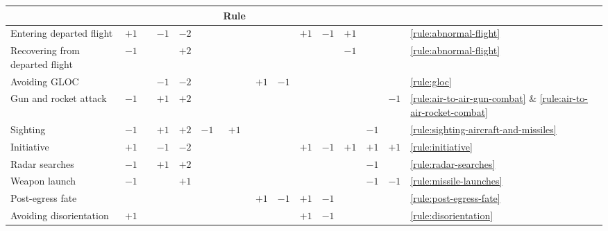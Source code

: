 \begin{twocolumntablefloat}
\begin{twocolumntable}
{\begin{tabularx}{1.0\linewidth}{l*{13}{C}l}
&&
&&&
&Rule\\
\midrule
Entering departed flight        &$+1$&    &$-1$&$-2$&     &     &    &     &$+1$&$-1$&$+1$ &    &    
&\ref{rule:abnormal-flight}\\
Recovering from departed flight &$-1$&    &    &$+2$&     &     &    &     &    &    &$-1$ &    &    
&\ref{rule:abnormal-flight}\\
Avoiding GLOC                   &    &    &$-1$&$-2$&     &     &$+1$&$-1$ &    &    &     &    &    
&\ref{rule:gloc}\\
Gun and rocket attack           &$-1$&    &$+1$&$+2$&     &     &    &     &    &    &     &    &$-1$
&\ref{rule:air-to-air-gun-combat} \& \ref{rule:air-to-air-rocket-combat}\\
Sighting                        &$-1$&    &$+1$&$+2$& $-1$&$+1$ &    &     &    &    &     &$-1$&    
&\ref{rule:sighting-aircraft-and-missiles}\\
Initiative                      &$+1$&    &$-1$&$-2$&     &     &    &     &$+1$&$-1$& $+1$&$+1$&$+1$
&\ref{rule:initiative}\\
Radar searches                  &$-1$&    &$+1$&$+2$&     &     &    &     &    &    &     &$-1$&    
&\ref{rule:radar-searches}\\
Weapon launch                   &$-1$&    &    &$+1$&     &     &    &     &    &    &     &$-1$&$-1$
&\ref{rule:missile-launches}\\
Post-egress fate                &    &    &    &    &     &     &$+1$&$-1$ &$+1$&$-1$&     &    &    
&\ref{rule:post-egress-fate}\\
Avoiding disorientation         &$+1$&    &    &     &    &     &    &     &$+1$&$-1$&     &    &    
&\ref{rule:disorientation}\\
\bottomrule
\end{tabularx}
}
\end{twocolumntable}
\end{twocolumntablefloat}